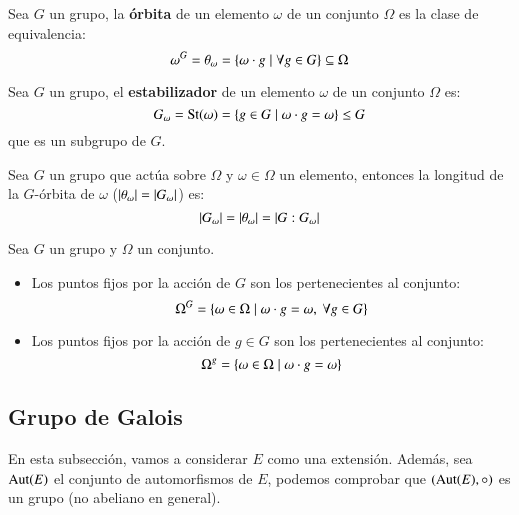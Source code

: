 \begin{dfn}
    Sea $G$ un grupo, la \textbf{órbita} de un elemento $\omega$ de un conjunto $\Omega$ es la clase de equivalencia:
    $$
        \omega^G = \theta_\omega = \left\{\omega \cdot g \mid \forall g \in G\right\} \subseteq \Omega
    $$
\end{dfn}

\begin{dfn}
    Sea $G$ un grupo, el \textbf{estabilizador} de un elemento $\omega$ de un conjunto $\Omega$ es:
    $$
        G_\omega = \mathrm{St}(\omega) = \left\{g \in G \mid \omega \cdot g = \omega\right\} \leq G
    $$
    que es un subgrupo de $G$.
\end{dfn}

\begin{thm}\label{thm:orbita}
    Sea $G$ un grupo que actúa sobre $\Omega$ y $\omega \in \Omega$ un elemento, entonces la longitud de la $G$-órbita de $\omega$ ($\left|\theta_\omega\right| = \left|G_\omega\right|$) es:
    $$
        \left|G_\omega\right| = \left|\theta_\omega\right| = \left|G:G_\omega\right|
    $$
\end{thm}

\begin{dfn}
    Sea $G$ un grupo y $\Omega$ un conjunto.
    \begin{itemize}
        \item Los puntos fijos por la acción de $G$ son los pertenecientes al conjunto:
        $$
            \Omega^G = \left\{ \omega \in \Omega \mid \omega \cdot g = \omega,\ \forall g \in G\right\}
        $$
        \item Los puntos fijos por la acción de $g \in G$ son los pertenecientes al conjunto:
        $$
            \Omega^g = \left\{ \omega \in \Omega \mid \omega \cdot g = \omega\right\}
        $$
    \end{itemize}
\end{dfn}

\subsection{Grupo de Galois}

En esta subsección, vamos a considerar $E$ como una extensión. Además, sea $\mathrm{Aut}(E)$ el conjunto de automorfismos de $E$, podemos comprobar que $(\mathrm{Aut}(E), \circ)$ es un grupo (no abeliano en general).\\


